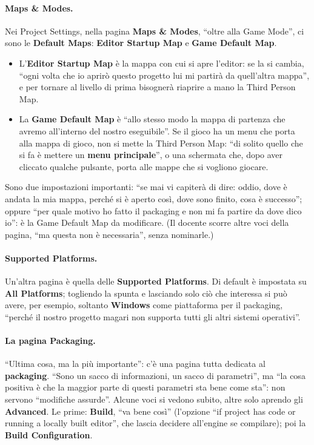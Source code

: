 \paragraph{Maps \& Modes.} Nei Project Settings, nella pagina \textbf{Maps \& Modes}, ``oltre
alla Game Mode'', ci sono le \textbf{Default Maps}: \textbf{Editor Startup Map} e
\textbf{Game Default Map}.
\begin{itemize}
  \item L'\textbf{Editor Startup Map} è la mappa con cui si apre l'editor: se la si cambia,
        ``ogni volta che io aprirò questo progetto lui mi partirà da quell'altra mappa'', e per
        tornare al livello di prima bisognerà riaprire a mano la Third Person Map.
  \item La \textbf{Game Default Map} è ``allo stesso modo la mappa di partenza che avremo
        all'interno del nostro eseguibile''. Se il gioco ha un menu che porta alla mappa di
        gioco, non si mette la Third Person Map: ``di solito quello che si fa è mettere un
        \textbf{menu principale}'', o una schermata che, dopo aver cliccato qualche pulsante,
        porta alle mappe che si vogliono giocare.
\end{itemize}
Sono due impostazioni importanti: ``se mai vi capiterà di dire: oddio, dove è andata la mia
mappa, perché si è aperto così, dove sono finito, cosa è successo''; oppure ``per quale motivo
ho fatto il packaging e non mi fa partire da dove dico io'': è la Game Default Map da
modificare. (Il docente scorre altre voci della pagina, ``ma questa non è necessaria'', senza
nominarle.)

\paragraph{Supported Platforms.} Un'altra pagina è quella delle \textbf{Supported Platforms}.
Di default è impostata su \textbf{All Platforms}; togliendo la spunta e lasciando solo ciò che
interessa si può avere, per esempio, soltanto \textbf{Windows} come piattaforma per il
packaging, ``perché il nostro progetto magari non supporta tutti gli altri sistemi
operativi''.

\paragraph{La pagina Packaging.} ``Ultima cosa, ma la più importante'': c'è una pagina tutta
dedicata al \textbf{packaging}. ``Sono un sacco di informazioni, un sacco di parametri'', ma
``la cosa positiva è che la maggior parte di questi parametri sta bene come sta'': non servono
``modifiche assurde''. Alcune voci si vedono subito, altre solo aprendo gli
\textbf{Advanced}. Le prime: \textbf{Build}, ``va bene così'' (l'opzione ``if project has code
or running a locally built editor'', che lascia decidere all'engine se compilare); poi la
\textbf{Build Configuration}.

